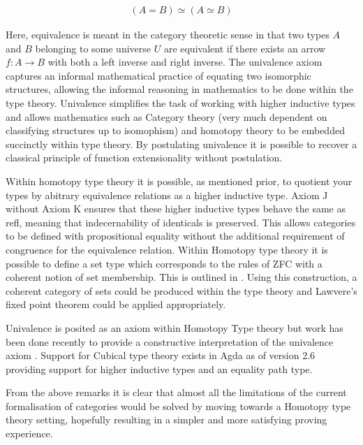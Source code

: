 \begin{align*}
    (A = B) \simeq (A \simeq B)
\end{align*}

Here, equivalence is meant in the category theoretic sense in that
two types $A$ and $B$ belonging to some universe $U$ are equivalent if there
exists an arrow $f : A \rightarrow B$ with both a left inverse and right
inverse. The univalence axiom captures an informal mathematical practice of
equating two isomorphic structures, allowing the informal reasoning in
mathematics to be done within the type theory. Univalence simplifies the task of
working with higher inductive types and allows mathematics such as Category
theory (very much dependent on classifying structures up to isomophism) and
homotopy theory to be embedded succinctly within type theory. By postulating
univalence it is possible to recover a classical principle of function
extensionality without postulation.

Within homotopy type theory it is possible, as mentioned prior, to quotient your
types by abitrary equivalence relations as a higher inductive type.
\textsf{Axiom J} without \textsf{Axiom K} ensures that these higher inductive
types behave the same as \textsf{refl}, meaning that indecernability of identicals
is preserved. This allows categories to be defined with propositional equality
without the additional requirement of congruence for the equivalence relation.
Within Homotopy type theory it is possible to define a set type which
corresponds to the rules of ZFC with a coherent notion of set membership. This
is outlined in . Using this construction, a coherent category of sets
could be produced within the type theory and Lawvere's fixed point theorem could
be applied appropriately.

Univalence is posited as an axiom within Homotopy Type theory but work has been
done recently to provide a constructive interpretation of the univalence axiom
.  Support for Cubical type theory exists in Agda as of version
2.6 providing support for higher inductive types and an equality path type.

From the above remarks it is clear that almost all the limitations of the
current formalisation of categories would be solved by moving towards a Homotopy
type theory setting, hopefully resulting in a simpler and more satisfying
proving experience.
